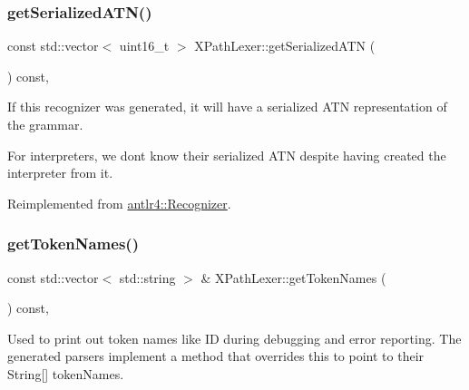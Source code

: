 \mbox{\label{classXPathLexer_a59ee9cba029ff18c8468321b75da8f66}} 
\subsubsection{\texorpdfstring{get\+Serialized\+A\+T\+N()}{getSerializedATN()}}
{\footnotesize\ttfamily const std\+::vector$<$ uint16\+\_\+t $>$ X\+Path\+Lexer\+::get\+Serialized\+A\+TN (\begin{DoxyParamCaption}{ }\end{DoxyParamCaption}) const\hspace{0.3cm}{\ttfamily [override]}, {\ttfamily [virtual]}}



If this recognizer was generated, it will have a serialized A\+TN representation of the grammar. 

For interpreters, we don\textquotesingle{}t know their serialized A\+TN despite having created the interpreter from it. 



Reimplemented from \hyperlink{classantlr4_1_1Recognizer_a06b4b78084e75ebafbbd86008914fb51}{antlr4\+::\+Recognizer}.

\mbox{\label{classXPathLexer_a6d2373c466f6a3d92ced0a2d79380a0d}} 
\subsubsection{\texorpdfstring{get\+Token\+Names()}{getTokenNames()}}
{\footnotesize\ttfamily const std\+::vector$<$ std\+::string $>$ \& X\+Path\+Lexer\+::get\+Token\+Names (\begin{DoxyParamCaption}{ }\end{DoxyParamCaption}) const\hspace{0.3cm}{\ttfamily [override]}, {\ttfamily [virtual]}}

Used to print out token names like ID during debugging and error reporting. The generated parsers implement a method that overrides this to point to their String\mbox{[}\mbox{]} token\+Names.

